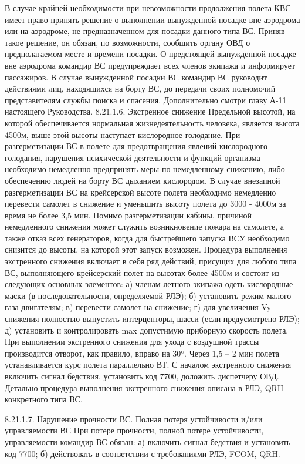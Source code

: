 В случае крайней необходимости при невозможности продолжения полета КВС имеет право принять решение о выполнении вынужденной посадке вне аэродрома или на аэродроме, не предназначенном для посадки данного типа ВС. Приняв такое решение, он обязан, по возможности, сообщить органу ОВД о предполагаемом месте и времени посадки.
О предстоящей вынужденной посадке вне аэродрома командир ВС предупреждает всех членов экипажа и информирует пассажиров.
В случае вынужденной посадки ВС командир ВС руководит действиями лиц, находящихся на борту ВС, до передачи своих полномочий представителям службы поиска и спасения.
Дополнительно смотри главу А-11 настоящего Руководства.
8.21.1.6.	Экстренное снижение
Предельной высотой, на которой обеспечивается нормальная жизнедеятельность человека, является высота 4500м, выше этой высоты наступает кислородное голодание. При разгерметизации ВС в полете для предотвращения явлений кислородного голодания, нарушения психической деятельности и функций организма необходимо немедленно предпринять меры по немедленному снижению, либо обеспечению людей на борту ВС дыханием кислородом.
В случае внезапной разгерметизации ВС на крейсерской высоте полета необходимо немедленно перевести самолет в снижение и уменьшить высоту полета до 3000 - 4000м за время не более 3,5 мин.
Помимо разгерметизации кабины, причиной немедленного снижения может служить возникновение пожара на самолете, а также отказ всех генераторов, когда для быстрейшего запуска ВСУ необходимо снизится до высоты, на которой этот запуск возможен.
Процедура выполнения экстренного снижения включает в себя ряд действий, присущих для любого типа ВС, выполняющего крейсерский полет на высотах более 4500м и состоит из следующих основных элементов:
а)	членам летного экипажа одеть кислородные маски (в последовательности, определяемой РЛЭ);
б)	установить режим малого газа двигателям;
в)	перевести самолет на снижение;
г)	для увеличения Vy снижения полностью выпустить интерцепторы, шасси (если предусмотрено РЛЭ);
д)	установить и контролировать max допустимую приборную скорость полета.
При выполнении экстренного снижения для ухода с воздушной трассы производится отворот, как правило, вправо на 30º. Через 1,5 – 2 мин полета устанавливается курс полета параллельно ВТ.
С началом экстренного снижения включить сигнал бедствия, установить код 7700, доложить диспетчеру ОВД.
Детально процедура выполнения экстренного снижения описана в РЛЭ, QRH конкретного типа ВС.


8.21.1.7.	Нарушение прочности ВС. Полная потеря устойчивости и/или управляемости ВС
При потере прочности, полной потере устойчивости, управляемости командир ВС обязан:
а)	включить сигнал бедствия и установить код 7700;
б)	действовать в соответствии с требованиями РЛЭ, FCOM, QRH.


